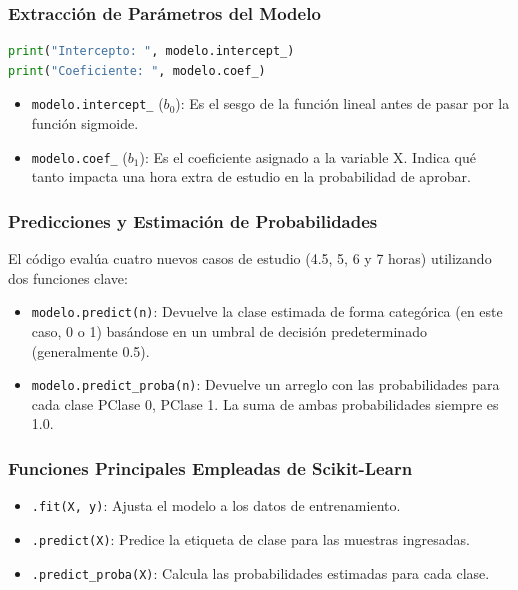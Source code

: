\documentclass[]{article}
\begin{document}
\subsubsection*{Extracción de Parámetros del Modelo}
\begin{lstlisting}[language=Python]
print("Intercepto: ", modelo.intercept_)
print("Coeficiente: ", modelo.coef_)
\end{lstlisting}
\begin{itemize}
    \item \texttt{modelo.intercept\_} ($b_0$): Es el sesgo de la función lineal antes de pasar por la función sigmoide.
    \item \texttt{modelo.coef\_} ($b_1$): Es el coeficiente asignado a la variable X. Indica qué tanto impacta una hora extra de estudio en la probabilidad de aprobar.
\end{itemize}

\subsubsection*{Predicciones y Estimación de Probabilidades}
El código evalúa cuatro nuevos casos de estudio (4.5, 5, 6 y 7 horas) utilizando dos funciones clave:
\begin{itemize}
    \item \texttt{modelo.predict(n)}: Devuelve la clase estimada de forma categórica (en este caso, 0 o 1) basándose en un umbral de decisión predeterminado (generalmente 0.5).
    \item \texttt{modelo.predict\_proba(n)}: Devuelve un arreglo con las probabilidades para cada clase PClase 0, PClase 1. La suma de ambas probabilidades siempre es 1.0.
\end{itemize}

\subsubsection*{Funciones Principales Empleadas de Scikit-Learn}
\begin{itemize}
    \item \texttt{.fit(X, y)}: Ajusta el modelo a los datos de entrenamiento.
    \item \texttt{.predict(X)}: Predice la etiqueta de clase para las muestras ingresadas.
    \item \texttt{.predict\_proba(X)}: Calcula las probabilidades estimadas para cada clase.
\end{itemize}
\end{document}
